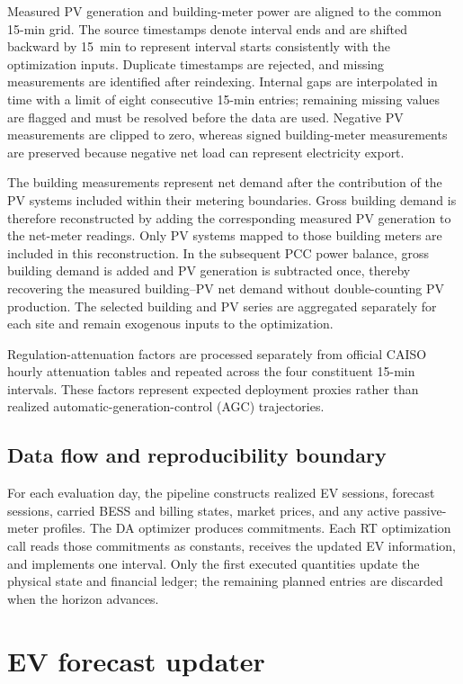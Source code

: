 \documentclass[final,5p,times]{elsarticle}
\begin{document}
Measured PV generation and building-meter power are aligned
to the common 15-min grid. The source timestamps denote
interval ends and are shifted backward by 15~min to represent
interval starts consistently with the optimization inputs.
Duplicate timestamps are rejected, and missing measurements
are identified after reindexing. Internal gaps are interpolated
in time with a limit of eight consecutive 15-min entries;
remaining missing values are flagged and must be resolved
before the data are used. Negative PV measurements are
clipped to zero, whereas signed building-meter measurements
are preserved because negative net load can represent
electricity export.

The building measurements represent net demand after the
contribution of the PV systems included within their metering
boundaries. Gross building demand is therefore reconstructed
by adding the corresponding measured PV generation to the
net-meter readings. Only PV systems mapped to those building
meters are included in this reconstruction. In the subsequent
PCC power balance, gross building demand is added and PV
generation is subtracted once, thereby recovering the
measured building--PV net demand without double-counting
PV production. The selected building and PV series are
aggregated separately for each site and remain exogenous
inputs to the optimization.

Regulation-attenuation factors are processed separately from
official CAISO hourly attenuation tables and repeated across
the four constituent 15-min intervals. These factors represent
expected deployment proxies rather than realized
automatic-generation-control (AGC) trajectories.

\subsection{Data flow and reproducibility boundary}
For each evaluation day, the pipeline constructs realized EV sessions, forecast sessions, carried BESS and billing states, market prices, and any active passive-meter profiles. The DA optimizer produces commitments. Each RT optimization call reads those commitments as constants, receives the updated EV information, and implements one interval. Only the first executed quantities update the physical state and financial ledger; the remaining planned entries are discarded when the horizon advances.

\section{EV forecast updater}
\label{sec:forecasting}
\end{document}
